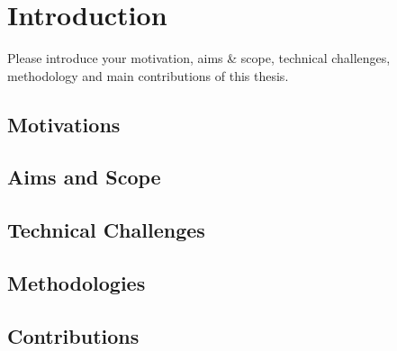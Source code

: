 \chapter{Introduction}
\label{chap:introduction}

Please introduce your motivation, aims \& scope, technical challenges, methodology and main contributions of this thesis.

\section{Motivations}

\section{Aims and Scope}

\section{Technical Challenges}

\section{Methodologies}

\section{Contributions}


